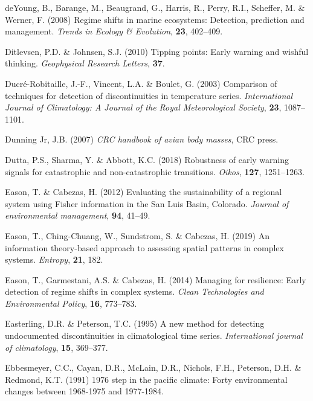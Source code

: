 \documentclass[print]{nuthesis}
\begin{document}
\leavevmode\hypertarget{ref-deyoung_regime_2008}{}%
deYoung, B., Barange, M., Beaugrand, G., Harris, R., Perry, R.I., Scheffer, M. \& Werner, F. (2008) Regime shifts in marine ecosystems: Detection, prediction and management. \emph{Trends in Ecology \& Evolution}, \textbf{23}, 402--409.

\leavevmode\hypertarget{ref-ditlevsen2010tipping}{}%
Ditlevsen, P.D. \& Johnsen, S.J. (2010) Tipping points: Early warning and wishful thinking. \emph{Geophysical Research Letters}, \textbf{37}.

\leavevmode\hypertarget{ref-ducre2003comparison}{}%
Ducré-Robitaille, J.-F., Vincent, L.A. \& Boulet, G. (2003) Comparison of techniques for detection of discontinuities in temperature series. \emph{International Journal of Climatology: A Journal of the Royal Meteorological Society}, \textbf{23}, 1087--1101.

\leavevmode\hypertarget{ref-dunning2007crc}{}%
Dunning Jr, J.B. (2007) \emph{CRC handbook of avian body masses}, CRC press.

\leavevmode\hypertarget{ref-dutta2018robustness}{}%
Dutta, P.S., Sharma, Y. \& Abbott, K.C. (2018) Robustness of early warning signals for catastrophic and non-catastrophic transitions. \emph{Oikos}, \textbf{127}, 1251--1263.

\leavevmode\hypertarget{ref-eason_evaluating_2012}{}%
Eason, T. \& Cabezas, H. (2012) Evaluating the sustainability of a regional system using Fisher information in the San Luis Basin, Colorado. \emph{Journal of environmental management}, \textbf{94}, 41--49.

\leavevmode\hypertarget{ref-eason2019information}{}%
Eason, T., Ching-Chuang, W., Sundstrom, S. \& Cabezas, H. (2019) An information theory-based approach to assessing spatial patterns in complex systems. \emph{Entropy}, \textbf{21}, 182.

\leavevmode\hypertarget{ref-eason2014managing}{}%
Eason, T., Garmestani, A.S. \& Cabezas, H. (2014) Managing for resilience: Early detection of regime shifts in complex systems. \emph{Clean Technologies and Environmental Policy}, \textbf{16}, 773--783.

\leavevmode\hypertarget{ref-easterling1995new}{}%
Easterling, D.R. \& Peterson, T.C. (1995) A new method for detecting undocumented discontinuities in climatological time series. \emph{International journal of climatology}, \textbf{15}, 369--377.

\leavevmode\hypertarget{ref-ebbesmeyer19911976}{}%
Ebbesmeyer, C.C., Cayan, D.R., McLain, D.R., Nichols, F.H., Peterson, D.H. \& Redmond, K.T. (1991) 1976 step in the pacific climate: Forty environmental changes between 1968-1975 and 1977-1984.
\end{document}
